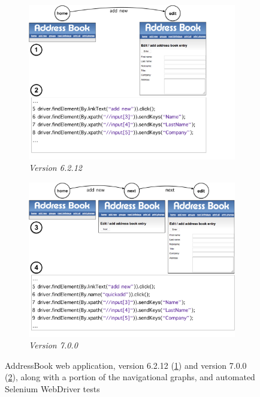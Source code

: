 \begin{figure}[t]
\centering
\begin{subfigure}{\columnwidth}
\centering
\includegraphics[trim=0cm 0cm 0cm 0cm, clip=true, scale=0.23]{images/misselection-part1.pdf}
\caption{\emph{Version 6.2.12}}
\label{fig:ab1} 
\end{subfigure}
\begin{subfigure}{\columnwidth}
\centering
\includegraphics[trim=0cm 0cm 0cm 0cm, clip=true, scale=0.23]{images/misselection-part2.pdf}
\caption{\emph{Version 7.0.0}}
\label{fig:ab2} 
\end{subfigure}
\caption{AddressBook web application, version 6.2.12 (\ref{fig:ab1}) and version 7.0.0 (\ref{fig:ab2}), along with a portion of the navigational graphs, and automated Selenium WebDriver tests}
\label{misselection}
\end{figure}

